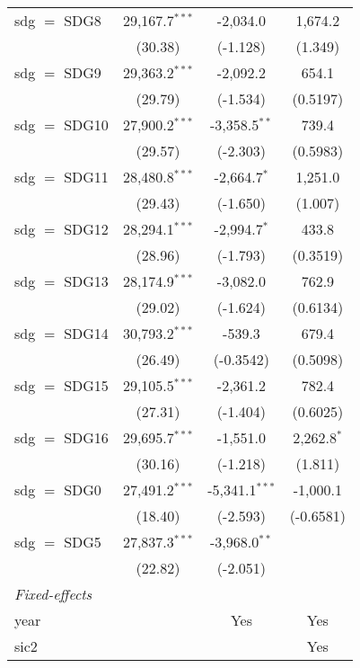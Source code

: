 \begin{tabular}{lccc}
   sdg $=$ SDG8  & 29,167.7$^{***}$ & -2,034.0         & 1,674.2\\   
                 & (30.38)          & (-1.128)         & (1.349)\\   
   sdg $=$ SDG9  & 29,363.2$^{***}$ & -2,092.2         & 654.1\\   
                 & (29.79)          & (-1.534)         & (0.5197)\\   
   sdg $=$ SDG10 & 27,900.2$^{***}$ & -3,358.5$^{**}$  & 739.4\\   
                 & (29.57)          & (-2.303)         & (0.5983)\\   
   sdg $=$ SDG11 & 28,480.8$^{***}$ & -2,664.7$^{*}$   & 1,251.0\\   
                 & (29.43)          & (-1.650)         & (1.007)\\   
   sdg $=$ SDG12 & 28,294.1$^{***}$ & -2,994.7$^{*}$   & 433.8\\   
                 & (28.96)          & (-1.793)         & (0.3519)\\   
   sdg $=$ SDG13 & 28,174.9$^{***}$ & -3,082.0         & 762.9\\   
                 & (29.02)          & (-1.624)         & (0.6134)\\   
   sdg $=$ SDG14 & 30,793.2$^{***}$ & -539.3           & 679.4\\   
                 & (26.49)          & (-0.3542)        & (0.5098)\\   
   sdg $=$ SDG15 & 29,105.5$^{***}$ & -2,361.2         & 782.4\\   
                 & (27.31)          & (-1.404)         & (0.6025)\\   
   sdg $=$ SDG16 & 29,695.7$^{***}$ & -1,551.0         & 2,262.8$^{*}$\\   
                 & (30.16)          & (-1.218)         & (1.811)\\   
   sdg $=$ SDG0  & 27,491.2$^{***}$ & -5,341.1$^{***}$ & -1,000.1\\   
                 & (18.40)          & (-2.593)         & (-0.6581)\\   
   sdg $=$ SDG5  & 27,837.3$^{***}$ & -3,968.0$^{**}$  &   \\   
                 & (22.82)          & (-2.051)         &   \\   
   \midrule
   \emph{Fixed-effects}\\
   year          &                  & Yes              & Yes\\  
   sic2          &                  &                  & Yes\\  

\end{tabular}

